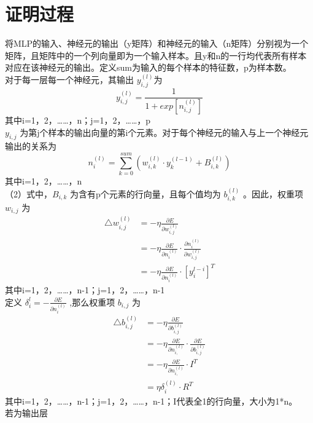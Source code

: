 \documentclass[UTF8]{ctexart}
\begin{document}
\section{证明过程}
将MLP的输入、神经元的输出（y矩阵）和神经元的输入（n矩阵）分别视为一个矩阵，且矩阵中的一个列向量即为一个输入样本。且y和n的一行均代表所有样本对应在该神经元的输出。定义sum为输入的每个样本的特征数，p为样本数。\\
对于每一层每一个神经元，其输出 $y_{i,j}^{(l)} $为
\begin{equation}
y_{i,j}^{(l)}=\frac{1}{1+exp[n_{i,j}^{(l)}]}
\end{equation}
其中i=1，2，……，n；j=1，2，……，p\\
$y_{i,j}$ 为第j个样本的输出向量的第i个元素。对于每个神经元的输入与上一个神经元输出的关系为
\begin{equation}
n_{i}^{(l)}=\sum_{k=0}^{sum}(w_{i,k}^{(l)}\cdot y_{k}^{(l-1)}+B_{i,k}^{(l)})
\end{equation}
其中i=1，2，……，n\\
（2）式中，$B_{i,k}$ 为含有p个元素的行向量，且每个值均为 $b_{i,k}^{(l)}$ 。因此，权重项 $w_{i,j}$ 为
\begin{equation}
\begin{aligned}
\triangle w_{i,j}^{(l)}&=-\eta \frac{\partial E}{\partial w_{i,j}^{(l)}}\\
&=-\eta \frac{\partial E}{\partial n_{i}^{(l)}}\cdot \frac{\partial n_{i}^{(l)}}{\partial w_{i,j}^{(l)}}\\
&=-\eta \frac{\partial E}{\partial n_{i}^{(l)}}\cdot [y_{i}^{l-i}]^T
\end{aligned}
\end{equation}
其中i=1，2，……，n-1；j=1，2，……，n-1\\
定义 \( \delta_{i}^{l}=-\frac{\partial E}{\partial n_{i}^{(l)}} \) ,那么权重项 $b_{i,j}$ 为
\begin{equation}
\begin{aligned}
\triangle b_{i,j}^{(l)}&=-\eta \frac{\partial E}{\partial b_{i,j}^{(l)}}\\
&=-\eta \frac{\partial E}{\partial n_{i,}^{(l)}}\cdot \frac{\partial E}{\partial b_{i,j}^{(l)}}\\
&=-\eta \frac{\partial E}{\partial n_{i,}^{(l)}}\cdot I^T\\
&=\eta \delta_{i}^{(l)}\cdot R^T
\end{aligned}
\end{equation}
其中i=1，2，……，n-1；j=1，2，……，n-1；I代表全1的行向量，大小为1*n。\\
若为输出层
\end{document}
